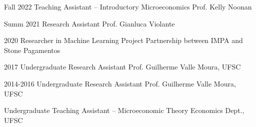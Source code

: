 

\begin{cvskills}

  \cvexp
    {Fall 2022} %
    {Teaching Assistant -- Introductory Microeconomics} %
    {Prof. Kelly Noonan} %

  \cvexp
    {Summ 2021} %
    {Research Assistant} %
    {Prof. Gianluca Violante} %

  \cvexp
    {2020} %
    {Researcher in Machine Learning Project} %
    {Partnership between IMPA and Stone Pagamentos} %

  \cvexp
    {2017} %
    {Undergraduate Research Assistant} %
    {Prof. Guilherme Valle Moura, UFSC} %

  \cvexp
    {2014-2016} %
    {Undergraduate Research Assistant} %
    {Prof. Guilherme Valle Moura, UFSC} %


    {Undergraduate Teaching Assistant -- Microeconomic Theory} %
    {Economics Dept., UFSC} %
    

\end{cvskills}
